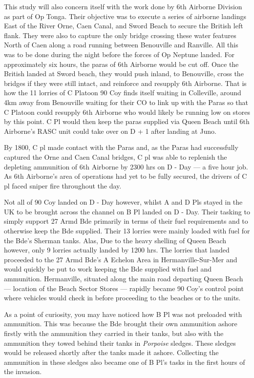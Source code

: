 \documentclass[noraggedright]{turabian-researchpaper}
\begin{document}
This study will also concern itself with the work done by 6th Airborne
Division as part of Op Tonga.  Their objective was to execute a series of
airborne landings East of the River Orne, Caen Canal, and Sword Beach to 
secure the British left flank.  They were also to capture the only bridge 
crossing
these water features North of Caen along a road running between Benouville
and Ranville.  All this was to be done during the night before the forces of
Op Neptune landed.  For approximately six hours, the paras of 6th Airborne
would be cut off.  Once the British landed at Sword beach, they would push
inland, to Benouville, cross the bridges if they were still intact, and
reinforce and resupply 6th Airborne.  That is how the 11 lorries of C Platoon 
90 Coy finds itself waiting in Colleville, around 4km away from Benouville
waiting for their CO to link up with the Paras so that C Platoon could 
resupply 6th Airborne who would likely be running low on stores by this point.
C Pl would then keep the paras supplied via Queen Beach until 6th Airborne's 
RASC unit could take over on D + 1 after landing at Juno.\autocite[1]{90wdjun}

By 1800, C pl made contact with the Paras and, as the Paras had successfully
captured the Orne and Caen Canal bridges, C pl was able to replenish the 
depleting ammunition of 6th Airborne by 2300 hrs on D - Day --- a five hour
job.  As 6th Airborne's area of operations had yet to be fully secured, the
drivers of C pl faced sniper fire throughout the day.\autocite[6 June 1944]
{90wd}

Not all of 90 Coy landed on D - Day however, whilst A and D Pls stayed in the
UK to be brought across the channel on %
B Pl landed on D - Day.  
Their tasking to simply support 27 Armd Bde primarily in terms
of their fuel requirements and to otherwise keep the Bde supplied.  Their 13
lorries were mainly loaded with fuel for the Bde's Sherman tanks.  Alas,
Due to the heavy shelling of Queen Beach however, only 9 lorries actually 
landed by 1200 hrs.  The lorries that landed proceeded to the 27 Armd Bde's 
A Echelon Area in Hermanville-Sur-Mer and would quickly be put to work keeping
the Bde supplied with fuel and ammunition.\autocite[6 June 1944]{90wd}
Hermanville, situated along the main road departing Queen Beach --- location
of the Beach Sector Stores --- rapidly became 90 Coy's control point where
vehicles would check in before proceeding to the beaches or to the units.

As a point of
curiosity, you may have noticed how B Pl was not preloaded with ammunition.  
This was because the Bde brought their own ammunition ashore firstly with
the ammunition they carried in their tanks, but also with the ammunition 
they towed behind their tanks in \textit{Porpoise} sledges.\autocite[2--3]
{90wdjun}  These sledges
would be released shortly after the tanks made it ashore.  Collecting the
ammunition in these sledges also became one of B Pl's tasks in the first
hours of the invasion.%
\end{document}

